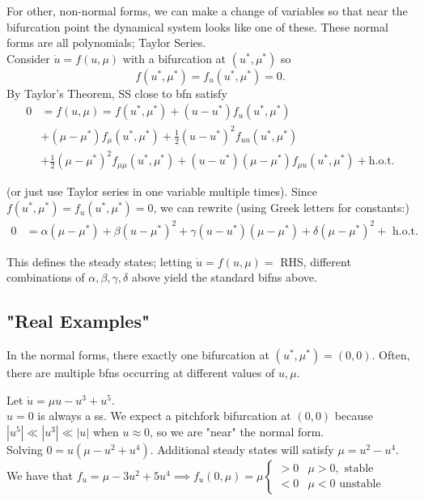 \documentclass[12pt, oneside]{article}
\begin{document}
For other, non-normal forms, we can make a change of variables so that near the bifurcation point the dynamical system looks like one of these. These normal forms are all polynomials; Taylor Series.\\
Consider $\dot{u} = f(u,\mu)$ with a bifurcation at $(u^*,\mu^*)$ so $$f(u^*,\mu^*) = f_u(u^*,\mu^*) = 0.$$ By Taylor's Theorem, SS close to bfn satisfy\begin{align*}
  0 &= f(u,\mu) = f(u^*,\mu^*) + (u-u^*)f_u(u^*,\mu^*) \\&+ (\mu - \mu^*)f_\mu(u^*,\mu^*) + \frac{1}{2}(u - u^*)^2f_{uu}(u^*,\mu^*) \\&+ \frac{1}{2}(\mu - \mu^*)^2f_{\mu\mu}(u^*,\mu^*) + (u - u^*)(\mu-\mu^*)f_{\mu u}(u^*,\mu^*) + \text{h.o.t.}
\end{align*}

(or just use Taylor series in one variable multiple times). Since $f(u^*,\mu^*) = f_u(u^*,\mu^*) = 0$, we can rewrite (using Greek letters for constants:)
\begin{align*}
  0 &= \alpha (\mu - \mu^*)+\beta(u-\mu^*)^2 + \gamma (u - u^*)(\mu - \mu^*)+\delta (\mu-\mu^*)^2 + \text{ h.o.t.}
\end{align*}

This defines the steady states; letting $\dot{u} = f(u,\mu) = $ RHS, different combinations of $\alpha, \beta, \gamma, \delta$ above yield the standard bifns above.  


\subsection{"Real Examples"}

In the normal forms, there exactly one bifurcation at $(u^*,\mu^*) = (0,0)$. Often, there are multiple bfns occurring at different values of $u, \mu$.

\begin{example}
  Let $\dot{u} = \mu u - u^3 + u^5$. \\
  $u = 0$ is always a ss. We expect a pitchfork bifurcation at $(0,0)$ because $|u^5| \ll |u^3| \ll |u|$ when $u \approx 0$, so we are "near" the normal form.\\
  Solving $0 = u(\mu - u^2 + u^4)$. Additional steady states will satisfy $\mu = u^2 - u^4$. We have that $f_u = \mu - 3u^2 + 5u^4 \implies f_u (0,\mu) = \mu \begin{cases}
    >0 & \mu > 0, \text{ stable}\\
    <0 & \mu < 0 \text{ unstable}
  \end{cases}$
\end{example}
\end{document}
